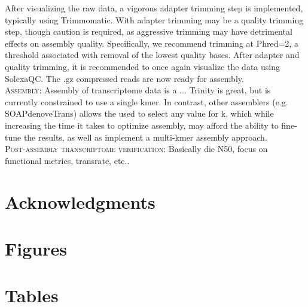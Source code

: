 \documentclass[11pt]{article}
\begin{document}
After visualizing the raw data, a vigorous adapter trimming step is implemented, typically using Trimmomatic. With adapter trimming may be a quality trimming step, though caution is required, as aggressive trimming may have detrimental effects on assembly quality. Specifically, we recommend trimming at Phred=2, a threshold associated with removal of the lowest quality bases. After adapter and quality trimming, it is recommended to once again visualize the data using SolexaQC. The .gz compressed reads are now ready for assembly. \\

\textsc{Assembly}: Assembly of transcriptome data is a ... Trinity is great, but is currently constrained to use a single kmer. In contrast, other assemblers (e.g. SOAPdenoveTrans) allows the used to select any value for k, which while increasing the time it takes to optimize assembly, may afford the ability to fine-tune the results, as well as implement a multi-kmer assembly approach. \\


\textsc{Post-assembly transcriptome verification}: Basically die N50, focus on functional metrics, transrate, etc.. \\



\section*{Acknowledgments}




\section*{Figures}


\section*{Tables}
\end{document}
